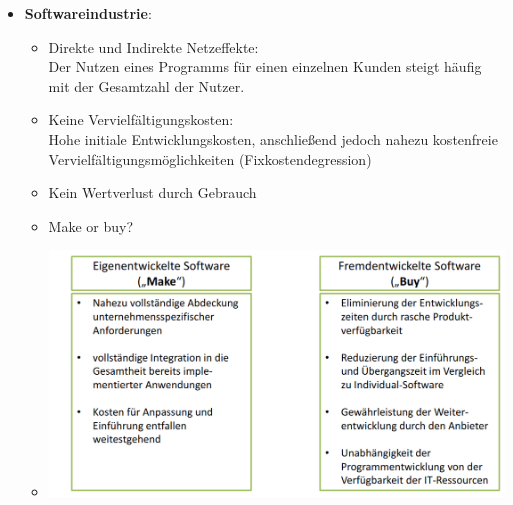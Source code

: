 \documentclass[12pt,a4paper]{article}
\begin{document}
\begin{itemize}
   \item \textbf{Softwareindustrie}:
      \begin{itemize}
			\item Direkte und Indirekte Netzeffekte:\\
			      Der Nutzen eines Programms für einen einzelnen Kunden steigt häufig mit der Gesamtzahl der Nutzer.
			\item Keine Vervielfältigungskosten:\\
			      Hohe initiale Entwicklungskosten, anschließend jedoch nahezu kostenfreie Ver\-viel\-fält\-ig\-ungs\-mög\-lich\-keit\-en (Fixkostendegression)
			\item Kein Wertverlust durch Gebrauch
			\item Make or buy?
         \item[] \includegraphics[scale=0.5]{MakeOrBuy.png}

\end{itemize}
\end{itemize}
\end{document}
